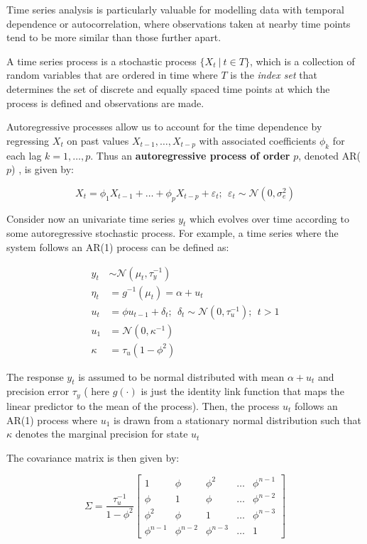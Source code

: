 \documentclass[
  letterpaper,
  DIV=11,
  numbers=noendperiod]{scrartcl}
\begin{document}
Time series analysis is particularly valuable for modelling data with
temporal dependence or autocorrelation, where observations taken at
nearby time points tend to be more similar than those further apart.

A time series process is a stochastic process \(\{X_t~|~t \in T\}\),
which is a collection of random variables that are ordered in time where
\(T\) is the \emph{index set} that determines the set of discrete and
equally spaced time points at which the process is defined and
observations are made.

Autoregressive processes allow us to account for the time dependence by
regressing \(X_t\) on past values \(X_{t-1},\ldots,X_{t-p}\) with
associated coefficients \(\phi_k\) for each lag \(k = 1,\ldots,p\). Thus
an \textbf{autoregressive process of order} \(p\), denoted AR(\(p\)) ,
is given by:

\[
X_t = \phi_1 X_{t-1} + \ldots + \phi_p X_{t-p} + \varepsilon_t; ~~ \varepsilon_t \sim \mathcal{N}(0,\sigma^2_e)
\]

Consider now an univariate time series \(y_t\) which evolves over time
according to some autoregressive stochastic process. For example, a time
series where the system follows an AR(1) process can be defined as:

\[
\begin{aligned}
y_t &\sim \mathcal{N}(\mu_t,\tau_y^{-1})\\
\eta_t &= g^{-1}(\mu_t) = \alpha + u_t \\
u_t &= \phi u_{t-1} + \delta_t ; ~~ \delta_t \sim \mathcal{N}(0,\tau_u^{-1}); ~~ t > 1 \\
u_1 &= \mathcal{N}(0,\kappa^{-1})\\
\kappa &= \tau_u (1-\phi^2)
\end{aligned}
\]

The response \(y_t\) is assumed to be normal distributed with mean
\(\alpha + u_t\) and precision error \(\tau_y\) ( here \(g(\cdot)\) is
just the identity link function that maps the linear predictor to the
mean of the process). Then, the process \(u_t\) follows an AR(1) process
where \(u_1\) is drawn from a stationary normal distribution such that
\(\kappa\) denotes the marginal precision for state \(u_t\)

The covariance matrix is then given by:

\[
\Sigma = \frac{\tau^{-1}_u}{1-\phi^2}
\begin{bmatrix}
1 & \phi & \phi^2 & \ldots & \phi^{n-1}\\
\phi & 1 & \phi & \ldots & \phi^{n-2} \\
\phi^2 & \phi & 1 & \ldots & \phi^{n-3} \\
\phi^{n-1} & \phi^{n-2} & \phi^{n-3} & \ldots & 1
\end{bmatrix}
\]
\end{document}
